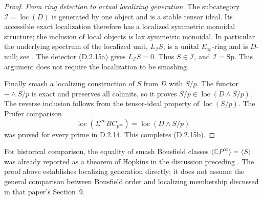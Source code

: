 \begin{proof}
\emph{From ring detection to actual localizing generation.}
The subcategory $\mathcal I=\operatorname{loc}(D)$ is generated by
one object and is a stable tensor ideal. Its accessible exact
localization therefore has a localized symmetric monoidal
structure; the inclusion of local objects is lax symmetric
monoidal. In particular the underlying spectrum of the localized
unit, $L_{\mathcal I}S$, is a unital $E_\infty$-ring and is
$D$-null; see
\cite[Example 2.2.1.7, Proposition 2.2.1.9]{FGHLurieHA}.
The detector \textup{(D.2.15a)} gives $L_{\mathcal I}S=0$.
Thus $S\in\mathcal I$, and $\mathcal I=\mathrm{Sp}$.
This argument does not require the localization to be smashing.

Finally smash a localizing construction of $S$ from $D$ with
$S/p$. The functor $-\wedge S/p$ is exact and preserves all
colimits, so it proves
$S/p\in\operatorname{loc}(D\wedge S/p)$.
The reverse inclusion follows from the tensor-ideal property of
$\operatorname{loc}(S/p)$. The Pr\"ufer comparison
\[
 \operatorname{loc}(\Sigma^\infty BC_{p^\infty})
       =\operatorname{loc}(D\wedge S/p)
\]
was proved for every prime in D.2.14. This completes
\textup{(D.2.15b)}.
\end{proof}

For historical comparison, the equality of smash Bousfield classes
$\langle\mathbb CP^\infty\rangle=\langle S\rangle$ was already
reported as a theorem of Hopkins in the discussion preceding
\cite[Conjecture 8.7]{JHoveyPalmieri1999}.
The proof above establishes localizing generation directly; it
does not assume the general comparison between Bousfield order
and localizing membership discussed in that paper's Section~9.
